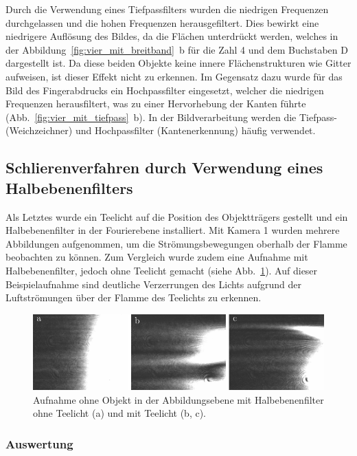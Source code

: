Durch die Verwendung eines Tiefpassfilters wurden die niedrigen Frequenzen durchgelassen und die hohen Frequenzen herausgefiltert. Dies bewirkt eine niedrigere Auflösung des Bildes, da die Flächen unterdrückt werden, welches in der Abbildung~\ref{fig:vier_mit_breitband}~b für die Zahl 4 und dem Buchstaben D dargestellt ist. Da diese beiden Objekte keine innere Flächenstrukturen wie Gitter aufweisen, ist dieser Effekt nicht zu erkennen.
Im Gegensatz dazu wurde für das Bild des Fingerabdrucks ein Hochpassfilter eingesetzt, welcher die niedrigen Frequenzen herausfiltert, was zu einer Hervorhebung der Kanten führte (Abb.~\ref{fig:vier_mit_tiefpass}~b). In der Bildverarbeitung werden die Tiefpass- (Weichzeichner) und Hochpassfilter (Kantenerkennung) häufig verwendet.


\subsection{Schlierenverfahren durch Verwendung eines Halbebenenfilters}

Als Letztes wurde ein Teelicht auf die Position des Objektträgers gestellt und ein Halbebenenfilter in der Fourierebene installiert. Mit Kamera 1 wurden mehrere Abbildungen aufgenommen, um die Strömungsbewegungen oberhalb der Flamme beobachten zu können. Zum Vergleich wurde zudem eine Aufnahme mit Halbebenenfilter, jedoch ohne Teelicht gemacht (siehe Abb.~\ref{fig:Halbebenenfilter_mit_und_ohne_Teelicht}). Auf dieser Beispielaufnahme sind deutliche Verzerrungen des Lichts aufgrund der Luftströmungen über der Flamme des Teelichts zu erkennen. 

\begin{figure}[h]
	\centering
	\includegraphics{images/ergebniss_Teelicht/abb.pdf}
	\caption[Schlieren]{
		Aufnahme ohne Objekt in der Abbildungsebene mit Halbebenenfilter ohne Teelicht (a) und mit Teelicht (b, c).
	}
	\label{fig:Halbebenenfilter_mit_und_ohne_Teelicht}
\end{figure}


\subsubsection*{Auswertung}

